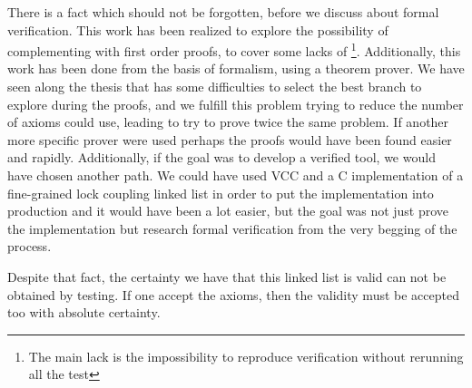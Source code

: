 There is a fact which should not be forgotten, before we discuss about formal verification. 
%
This work has been realized to explore the possibility of complementing \leap with first order proofs, to cover some lacks of \leap
\footnote{The main lack is the impossibility to reproduce verification without rerunning all the test}.
%
Additionally, this work has been done from the basis of formalism, using a theorem prover. 
%
We have seen along the thesis that \spass has some difficulties to select the best branch to explore during the proofs, and we fulfill this problem trying to reduce the number of axioms \spass could use, leading to try to prove twice the same problem. 
%
If another more specific prover were used perhaps the proofs would have been found easier and rapidly.
%
Additionally, if the goal was to develop a verified tool, we would have chosen another path. 
%
We could have used \gls{VCC} and a C implementation of a fine-grained lock coupling linked list in order to put the implementation into production and it would have been a lot easier, but the goal was not just prove the implementation but research formal verification from the very begging of the process.


Despite that fact, the certainty we have that this linked list is valid can not be obtained by testing. 
%
If one accept the axioms, then the validity must be accepted too with absolute certainty.
